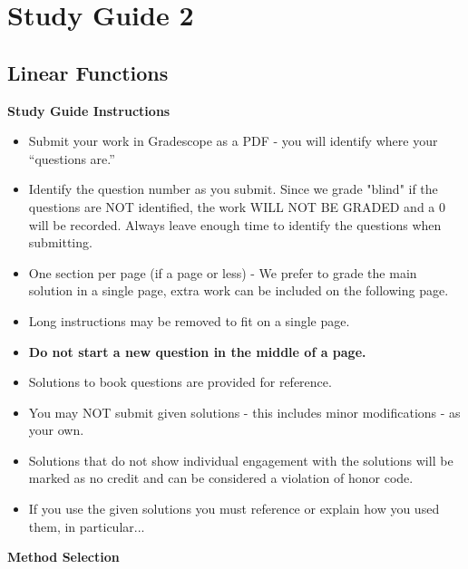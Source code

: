 \clearpage
\chapter{Study Guide 2}

\section{Linear Functions}

\begin{center}
    \large{\textbf{Study Guide Instructions}}
\end{center}


\begin{itemize}
    \item Submit your work in Gradescope as a PDF - you will identify where your “questions are.”
    \item Identify the question number as you submit.  Since we grade "blind" if the questions are NOT identified, the work WILL NOT BE GRADED and a 0 will be recorded. Always leave enough time to 
    identify the questions when submitting.
    \item One section per page (if a page or less) - We prefer to grade the main solution in a single page, extra work can be included on the following page.
    \item Long instructions may be removed to fit on a single page.
    \item \textbf{Do not start a new question in the middle of a page.}
    \item Solutions to book questions are provided for reference.
    \item You may NOT submit given solutions - this includes minor modifications - as your own.
    \item Solutions that do not show individual engagement with the solutions will be marked as no credit and can be considered a violation of honor code.
    \item If you use the given solutions you must reference or explain how you used them, in particular...
\end{itemize}


\begin{center}
    \large{\textbf{Method Selection}}
\end{center}


